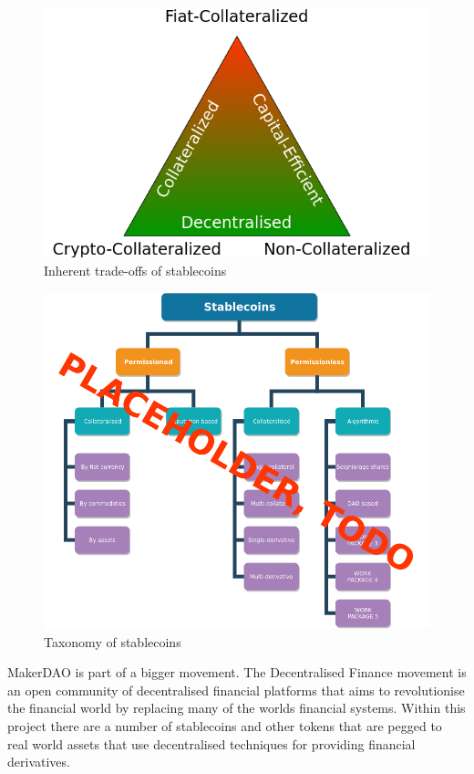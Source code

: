 \documentclass[english,]{IEEEtran}
\begin{document}
\begin{figure}
\centering
\includegraphics{img/Triangle.png}
\caption{Inherent trade-offs of stablecoins \label{triangle_label}}
\end{figure}

\begin{figure}
\centering
\includegraphics{img/intro.png}
\caption{Taxonomy of stablecoins \label{intro_label}}
\end{figure}

MakerDAO is part of a bigger movement. The Decentralised Finance
movement is an open community of decentralised financial platforms that
aims to revolutionise the financial world by replacing many of the
worlds financial systems. Within this project there are a number of
stablecoins and other tokens that are pegged to real world assets that
use decentralised techniques for providing financial derivatives.
\end{document}
